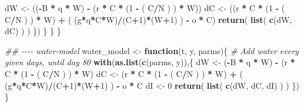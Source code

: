 \documentclass[
]{article}
\newenvironment{Shaded}{\begin{snugshade}}{\end{snugshade}}
\newcommand{\CommentTok}[1]{\textcolor[rgb]{0.56,0.35,0.01}{\textit{#1}}}
\newcommand{\ControlFlowTok}[1]{\textcolor[rgb]{0.13,0.29,0.53}{\textbf{#1}}}
\newcommand{\DecValTok}[1]{\textcolor[rgb]{0.00,0.00,0.81}{#1}}
\newcommand{\KeywordTok}[1]{\textcolor[rgb]{0.13,0.29,0.53}{\textbf{#1}}}
\newcommand{\NormalTok}[1]{#1}
\newcommand{\OperatorTok}[1]{\textcolor[rgb]{0.81,0.36,0.00}{\textbf{#1}}}
\newcommand{\StringTok}[1]{\textcolor[rgb]{0.31,0.60,0.02}{#1}}
\begin{document}
\begin{Shaded}
\begin{Highlighting}[numbers=left,,]
\NormalTok{      dW \textless{}{-}}\StringTok{ }\NormalTok{((}\OperatorTok{{-}}\NormalTok{B }\OperatorTok{*}\StringTok{ }\NormalTok{q }\OperatorTok{*}\StringTok{ }\NormalTok{W) }\OperatorTok{{-}}\StringTok{ }\NormalTok{(r }\OperatorTok{*}\StringTok{ }\NormalTok{C }\OperatorTok{*}\StringTok{ }\NormalTok{(}\DecValTok{1} \OperatorTok{{-}}\StringTok{ }\NormalTok{( C}\OperatorTok{/}\NormalTok{N ) ) }\OperatorTok{*}\StringTok{ }\NormalTok{W))}
\NormalTok{      dC \textless{}{-}}\StringTok{ }\NormalTok{((r }\OperatorTok{*}\StringTok{ }\NormalTok{C }\OperatorTok{*}\StringTok{ }\NormalTok{(}\DecValTok{1} \OperatorTok{{-}}\StringTok{ }\NormalTok{( C}\OperatorTok{/}\NormalTok{N ) ) }\OperatorTok{*}\StringTok{ }\NormalTok{W) }\OperatorTok{+}\StringTok{ }\NormalTok{( (g}\OperatorTok{*}\NormalTok{q}\OperatorTok{*}\NormalTok{C}\OperatorTok{*}\NormalTok{W)}\OperatorTok{/}\NormalTok{(C}\OperatorTok{+}\DecValTok{1}\NormalTok{)}\OperatorTok{*}\NormalTok{(W}\OperatorTok{+}\DecValTok{1}\NormalTok{) ) }\OperatorTok{{-}}\StringTok{ }\NormalTok{o }\OperatorTok{*}\StringTok{ }\NormalTok{C)}
      \KeywordTok{return}\NormalTok{( }\KeywordTok{list}\NormalTok{( }\KeywordTok{c}\NormalTok{(dW, dC) ) )}
\NormalTok{      \})}
\NormalTok{    \}}
\NormalTok{  \}}
\NormalTok{\}}

\CommentTok{\#\# {-}{-}{-}{-} water{-}model}
\NormalTok{water\_model \textless{}{-}}\StringTok{ }\ControlFlowTok{function}\NormalTok{(t, y, parms)\{}
  \CommentTok{\# Add water every given days, until day 80}
  \KeywordTok{with}\NormalTok{(}\KeywordTok{as.list}\NormalTok{(}\KeywordTok{c}\NormalTok{(parms, y)),\{}
\NormalTok{    dW \textless{}{-}}\StringTok{ }\NormalTok{(}\OperatorTok{{-}}\NormalTok{B }\OperatorTok{*}\StringTok{ }\NormalTok{q }\OperatorTok{*}\StringTok{ }\NormalTok{W) }\OperatorTok{{-}}\StringTok{ }\NormalTok{(r }\OperatorTok{*}\StringTok{ }\NormalTok{C }\OperatorTok{*}\StringTok{ }\NormalTok{(}\DecValTok{1} \OperatorTok{{-}}\StringTok{ }\NormalTok{( C}\OperatorTok{/}\NormalTok{N ) ) }\OperatorTok{*}\StringTok{ }\NormalTok{W)}
\NormalTok{    dC \textless{}{-}}\StringTok{ }\NormalTok{(r }\OperatorTok{*}\StringTok{ }\NormalTok{C }\OperatorTok{*}\StringTok{ }\NormalTok{(}\DecValTok{1} \OperatorTok{{-}}\StringTok{ }\NormalTok{( C}\OperatorTok{/}\NormalTok{N ) ) }\OperatorTok{*}\StringTok{ }\NormalTok{W) }\OperatorTok{+}\StringTok{ }\NormalTok{( (g}\OperatorTok{*}\NormalTok{q}\OperatorTok{*}\NormalTok{C}\OperatorTok{*}\NormalTok{W)}\OperatorTok{/}\NormalTok{(C}\OperatorTok{+}\DecValTok{1}\NormalTok{)}\OperatorTok{*}\NormalTok{(W}\OperatorTok{+}\DecValTok{1}\NormalTok{) ) }\OperatorTok{{-}}\StringTok{ }\NormalTok{o }\OperatorTok{*}\StringTok{ }\NormalTok{C}
\NormalTok{    dI \textless{}{-}}\StringTok{ }\DecValTok{0}
    \KeywordTok{return}\NormalTok{( }\KeywordTok{list}\NormalTok{( }\KeywordTok{c}\NormalTok{(dW, dC, dI) ) )}
\NormalTok{  \})}
\NormalTok{\}}


\end{Highlighting}
\end{Shaded}
\end{document}
